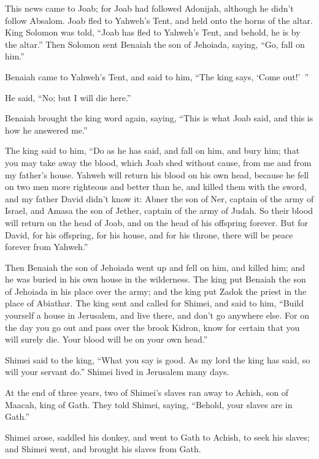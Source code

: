 {\par }{\PP {}This news came to Joab; for Joab had followed Adonijah, although he didn’t follow Absalom. Joab fled to Yahweh’s Tent, and held onto the horns of the altar.
King Solomon was told, “Joab has fled to Yahweh’s Tent, and behold, he is by the altar.” Then Solomon sent Benaiah the son of Jehoiada, saying, “Go, fall on him.”
\par }{\PP {}Benaiah came to Yahweh’s Tent, and said to him, “The king says, ‘Come out!’ ”
\par }{\PP He said, “No; but I will die here.”
\par }{\PP Benaiah brought the king word again, saying, “This is what Joab said, and this is how he answered me.”
\par }{\PP {}The king said to him, “Do as he has said, and fall on him, and bury him; that you may take away the blood, which Joab shed without cause, from me and from my father’s house.
Yahweh will return his blood on his own head, because he fell on two men more righteous and better than he, and killed them with the sword, and my father David didn’t know it: Abner the son of Ner, captain of the army of Israel, and Amasa the son of Jether, captain of the army of Judah.
So their blood will return on the head of Joab, and on the head of his offspring forever. But for David, for his offspring, for his house, and for his throne, there will be peace forever from Yahweh.”
\par }{\PP {}Then Benaiah the son of Jehoiada went up and fell on him, and killed him; and he was buried in his own house in the wilderness.
The king put Benaiah the son of Jehoiada in his place over the army; and the king put Zadok the priest in the place of Abiathar.
The king sent and called for Shimei, and said to him, “Build yourself a house in Jerusalem, and live there, and don’t go anywhere else.
For on the day you go out and pass over the brook Kidron, know for certain that you will surely die. Your blood will be on your own head.”
\par }{\PP {}Shimei said to the king, “What you say is good. As my lord the king has said, so will your servant do.” Shimei lived in Jerusalem many days.
\par }{\PP {}At the end of three years, two of Shimei’s slaves ran away to Achish, son of Maacah, king of Gath. They told Shimei, saying, “Behold, your slaves are in Gath.”
\par }{\PP {}Shimei arose, saddled his donkey, and went to Gath to Achish, to seek his slaves; and Shimei went, and brought his slaves from Gath.
}

